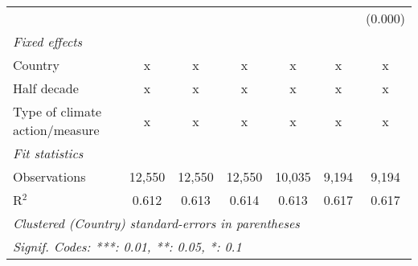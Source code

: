 \begin{tabular}{lcccccc}
                                                   &         &               &                &                &                & (0.000)\\   
   \emph{Fixed effects}\\
   Country                                         & x       & x             & x              & x              & x              & x\\  
   Half decade                                     & x       & x             & x              & x              & x              & x\\  
   Type of climate action/measure                  & x       & x             & x              & x              & x              & x\\  
   \midrule \emph{Fit statistics}\\
   Observations                                    & 12,550  & 12,550        & 12,550         & 10,035         & 9,194          & 9,194\\  
   R$^2$                                           & 0.612   & 0.613         & 0.614          & 0.613          & 0.617          & 0.617\\  
   \midrule
   \multicolumn{7}{l}{\emph{Clustered (Country) standard-errors in parentheses}}\\
   \multicolumn{7}{l}{\emph{Signif. Codes: ***: 0.01, **: 0.05, *: 0.1}}\\
\end{tabular}
\par\endgroup


